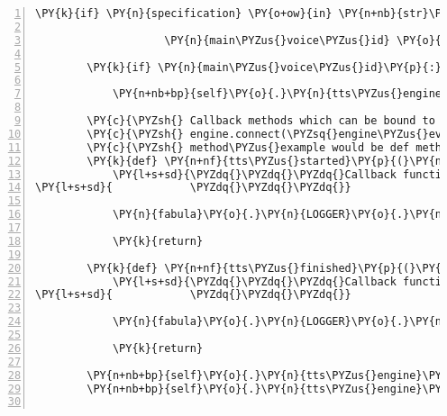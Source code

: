 \begin{Verbatim}[commandchars=\\\{\},numbers=left,firstnumber=1,stepnumber=1]
                \PY{k}{if} \PY{n}{specification} \PY{o+ow}{in} \PY{n+nb}{str}\PY{p}{(}\PY{n}{voice}\PY{o}{.}\PY{n}{name}\PY{p}{)}\PY{p}{:}

                    \PY{n}{main\PYZus{}voice\PYZus{}id} \PY{o}{=} \PY{n}{voice}\PY{o}{.}\PY{n}{id}

        \PY{k}{if} \PY{n}{main\PYZus{}voice\PYZus{}id}\PY{p}{:}

            \PY{n+nb+bp}{self}\PY{o}{.}\PY{n}{tts\PYZus{}engine}\PY{o}{.}\PY{n}{setProperty}\PY{p}{(}\PY{l+s}{\PYZsq{}}\PY{l+s}{voice}\PY{l+s}{\PYZsq{}}\PY{p}{,} \PY{n}{main\PYZus{}voice\PYZus{}id}\PY{p}{)}

        \PY{c}{\PYZsh{} Callback methods which can be bound to the events of the engine via}
        \PY{c}{\PYZsh{} engine.connect(\PYZsq{}engine\PYZus{}event\PYZsq{}, method\PYZus{}example) where definition of}
        \PY{c}{\PYZsh{} method\PYZus{}example would be def method\PYZus{}example(param):}
        \PY{k}{def} \PY{n+nf}{tts\PYZus{}started}\PY{p}{(}\PY{n}{name}\PY{p}{)}\PY{p}{:}
            \PY{l+s+sd}{\PYZdq{}\PYZdq{}\PYZdq{}Callback function for TTS engine starting an utterance.}
\PY{l+s+sd}{            \PYZdq{}\PYZdq{}\PYZdq{}}

            \PY{n}{fabula}\PY{o}{.}\PY{n}{LOGGER}\PY{o}{.}\PY{n}{debug}\PY{p}{(}\PY{l+s}{\PYZdq{}}\PY{l+s}{TTS: started utterance }\PY{l+s}{\PYZsq{}}\PY{l+s}{\PYZob{}\PYZcb{}}\PY{l+s}{\PYZsq{}}\PY{l+s}{\PYZdq{}}\PY{o}{.}\PY{n}{format}\PY{p}{(}\PY{n}{name}\PY{p}{)}\PY{p}{)}

            \PY{k}{return}

        \PY{k}{def} \PY{n+nf}{tts\PYZus{}finished}\PY{p}{(}\PY{n}{completed}\PY{p}{,} \PY{n}{name}\PY{p}{)}\PY{p}{:}
            \PY{l+s+sd}{\PYZdq{}\PYZdq{}\PYZdq{}Callback function for TTS engine finished an utterance.}
\PY{l+s+sd}{            \PYZdq{}\PYZdq{}\PYZdq{}}

            \PY{n}{fabula}\PY{o}{.}\PY{n}{LOGGER}\PY{o}{.}\PY{n}{debug}\PY{p}{(}\PY{l+s}{\PYZdq{}}\PY{l+s}{TTS: finished utterance}\PY{l+s}{\PYZdq{}}\PY{p}{)}

            \PY{k}{return}

        \PY{n+nb+bp}{self}\PY{o}{.}\PY{n}{tts\PYZus{}engine}\PY{o}{.}\PY{n}{connect}\PY{p}{(}\PY{l+s}{\PYZsq{}}\PY{l+s}{started\PYZhy{}utterance}\PY{l+s}{\PYZsq{}}\PY{p}{,} \PY{n}{tts\PYZus{}started}\PY{p}{)}
        \PY{n+nb+bp}{self}\PY{o}{.}\PY{n}{tts\PYZus{}engine}\PY{o}{.}\PY{n}{connect}\PY{p}{(}\PY{l+s}{\PYZsq{}}\PY{l+s}{finished\PYZhy{}utterance}\PY{l+s}{\PYZsq{}}\PY{p}{,} \PY{n}{tts\PYZus{}finished}\PY{p}{)}


\end{Verbatim}
